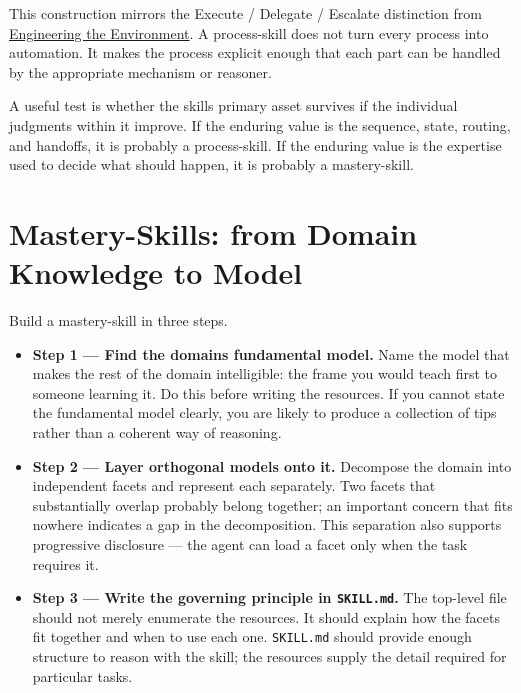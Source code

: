 This construction mirrors the Execute / Delegate / Escalate distinction from \href{4.4-engineering-the-environment.html}{Engineering the Environment}. A process-skill does not turn every process into automation. It makes the process explicit enough that each part can be handled by the appropriate mechanism or reasoner.


A useful test is whether the skill\textquotesingle s primary asset survives if the individual judgments within it improve. If the enduring value is the sequence, state, routing, and handoffs, it is probably a process-skill. If the enduring value is the expertise used to decide what should happen, it is probably a mastery-skill.

\section{Mastery-Skills: from Domain Knowledge to Model}\label{heading:mastery-skills-from-domain-knowledge-to-model}


Build a mastery-skill in three steps.

\begin{itemize}
\tightlist
\item
  \textbf{Step 1 --- Find the domain\textquotesingle s fundamental model.} Name the model that makes the rest of the domain intelligible: the frame you would teach first to someone learning it. Do this before writing the resources. If you cannot state the fundamental model clearly, you are likely to produce a collection of tips rather than a coherent way of reasoning.
\item
  \textbf{Step 2 --- Layer orthogonal models onto it.} Decompose the domain into independent facets and represent each separately. Two facets that substantially overlap probably belong together; an important concern that fits nowhere indicates a gap in the decomposition. This separation also supports progressive disclosure --- the agent can load a facet only when the task requires it.
\item
  \textbf{Step 3 --- Write the governing principle in \texttt{SKILL.md}.} The top-level file should not merely enumerate the resources. It should explain how the facets fit together and when to use each one. \texttt{SKILL.md} should provide enough structure to reason with the skill; the resources supply the detail required for particular tasks.
\end{itemize}

